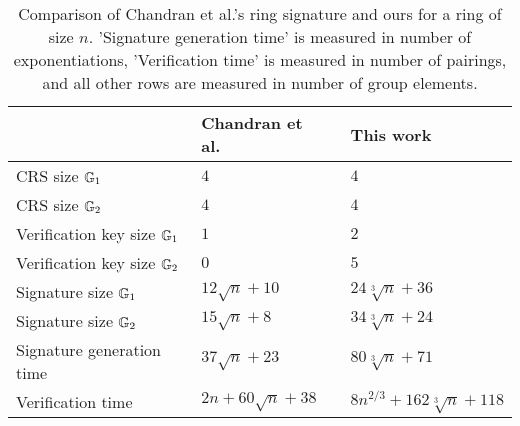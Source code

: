 
\begin{table}[h]
\begin{center}
\begin{minipage}{\textwidth}
\begin{center}
\begin{tabular}{l|l|l}
                                           & Chandran et al.~\cite{ICALP:ChaGroSah07} & This work \\
\hline%
\rule{0pt}{2.5ex}CRS size  $\mathbb{G}_1$              & $4$                                       & $4$       \\
\rule{0pt}{2.5ex}CRS size     $\mathbb{G}_2$    & $4$                                       & $4$       \\ 
\rule{0pt}{2.5ex}Verification key size $\mathbb{G}_1$    & $1$                                       & $2$       \\
\rule{0pt}{2.5ex}Verification key size  $\mathbb{G}_2$   & $0$                                       & $5$       \\
\rule{0pt}{2.5ex}Signature size      $\mathbb{G}_1$      & $12\sqrt{n}+10$                        & $24\sqrt[3]{n} + 36$\\
\rule{0pt}{2.5ex}Signature size      $\mathbb{G}_2$      & $15\sqrt{n}+8$                        & $34\sqrt[3]{n} + 24$\\       
\rule{0pt}{2.5ex}Signature generation time & $37\sqrt{n}+23$                        & $80\sqrt[3]{n}+71$\\
\rule{0pt}{2.5ex}Verification time         & $2n + 60\sqrt{n}+38$                & $8n^{2/3} + 162\sqrt[3]{n} + 118$\\
\end{tabular}
\end{center}
\caption{Comparison of Chandran et al.'s ring signature and ours for a ring of size $n$. 'Signature generation time' is measured in number of exponentiations, 'Verification time' is measured in number of pairings, and all other rows are measured in number of group elements.\label{table:eff}}
\end{minipage}
\end{center}
\end{table}
